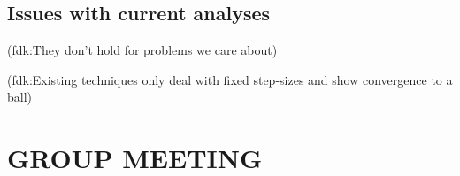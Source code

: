 \documentclass[twoside]{article}
\let\oldsection\section
\renewcommand{\section}[1]{\oldsection{\texorpdfstring{\uppercase{#1}}{#1}}}
\newcommand{\fdk}[1]{\textcolor{Periwinkle}{(fdk:#1)}}
\begin{document}
\subsection{Issues with current analyses}

\fdk{They don't hold for problems we care about}

\fdk{Existing techniques only deal with fixed step-sizes and show convergence to a ball}








\newpage




\clearpage
\section{Group Meeting}
\end{document}
